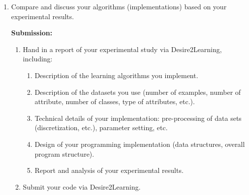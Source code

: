 \documentclass[12pt]{article}
\begin{document}
{\begin{enumerate}
\item Compare and discuss your algorithms (implementations) based on your experimental results. 

\textbf{Submission:}
\begin{enumerate}
\item Hand in a report of your experimental study via Desire2Learning, including:
\begin{enumerate}
\item Description of the learning algorithms you implement.
\item Description of the datasets you use (number of examples, number of attribute, number of classes, type of attributes, etc.).
\item Technical details of your implementation: pre-processing of data sets (discretization, etc.), parameter setting, etc. 
\item Design of your programming implementation (data structures, overall program structure).
\item Report and analysis of your experimental results. 
\end{enumerate}

\item Submit your code via Desire2Learning.
\end{enumerate}
\end{enumerate}

}

  


\newpage

\newpage

\newpage

%














%


\end{document}
